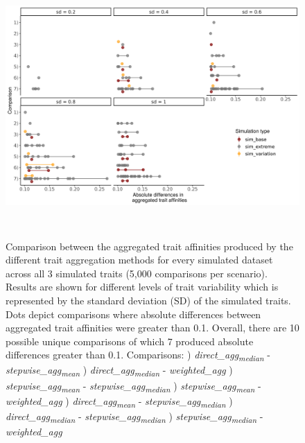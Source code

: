 \documentclass[12pt]{article}
\begin{document}
  \begin{figure}[H]
    \centering
    \includegraphics[width=16.5cm, height=10cm]{Diffs_indiv_runs_sim.png}
    \caption{Comparison between the aggregated trait affinities produced by the different trait aggregation methods for every simulated dataset across all 3 simulated traits (5,000 comparisons per scenario). Results are shown for different levels of trait variability which is represented by the standard deviation (SD) of the simulated traits. Dots depict comparisons where absolute differences between aggregated trait affinities were greater than 0.1. Overall, there are 10 possible unique comparisons of which 7 produced absolute differences greater than 0.1. \newline
    Comparisons: ) \textit{direct\_agg\textsubscript{median}} - \textit{stepwise\_agg\textsubscript{mean}} ) \textit{direct\_agg\textsubscript{median}} - \textit{weighted\_agg} ) \textit{stepwise\_agg\textsubscript{mean}} - \textit{stepwise\_agg\textsubscript{median}} ) \textit{stepwise\_agg\textsubscript{mean}} - \textit{weighted\_agg} ) \textit{direct\_agg\textsubscript{mean}} - \textit{stepwise\_agg\textsubscript{median}} ) \textit{direct\_agg\textsubscript{median}} - \textit{stepwise\_agg\textsubscript{median}} ) \textit{stepwise\_agg\textsubscript{median}} - \textit{weighted\_agg} \newline
    }
    \label{fig:sim_indv_runs}
  \end{figure}
\end{document}
